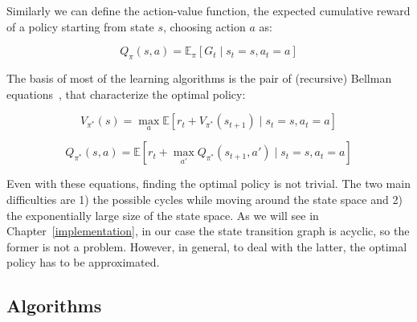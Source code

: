 Similarly we can define the action-value function, the expected cumulative reward of a policy starting from state $s$, choosing action $a$ as:

\begin{equation}\label{eq:actionvalueFunction}
Q_{\pi}(s, a)=\mathbb{E}_\pi[G_t \mid s_t = s, a_t = a]
\end{equation}


The basis of most of the learning algorithms is the pair of (recursive) Bellman equations~\cite{bellman1957bellmanequation}, that characterize the optimal policy:


\begin{equation}\label{eq:bellmanState}
V_{\pi^*}(s) = \max_a \mathbb{E} [r_t + V_{\pi^*}(s_{t+1}) \mid s_t=s, a_t=a]
\end{equation}


\begin{equation} \label{eq:bellmanAction}
Q_{\pi^*}(s,a) = \mathbb{E} [r_t + \max_{a'} Q_{\pi^*}(s_{t+1},a') \mid s_t=s, a_t=a ] 
\end{equation}

Even with these equations, finding the optimal policy is not trivial. The two main difficulties are 1) the possible cycles while moving around the state space and 2) the exponentially large size of the state space. As we will see in Chapter~\ref{implementation}, in our case the state transition graph is acyclic, so the former is not a problem. However, in general, to deal with the latter, the optimal policy has to be approximated.



\subsection{Algorithms}


